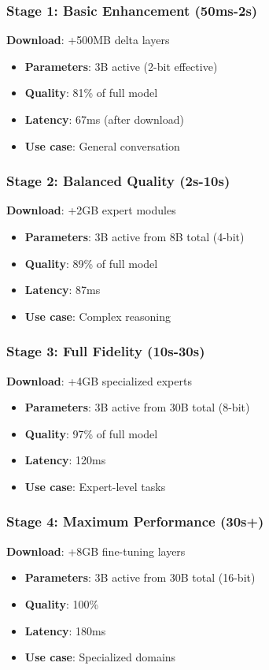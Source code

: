 \subsubsection{Stage 1: Basic Enhancement (50ms-2s)}
\textbf{Download}: +500MB delta layers
\begin{itemize}
    \item \textbf{Parameters}: 3B active (2-bit effective)
    \item \textbf{Quality}: 81\% of full model
    \item \textbf{Latency}: 67ms (after download)
    \item \textbf{Use case}: General conversation
\end{itemize}

\subsubsection{Stage 2: Balanced Quality (2s-10s)}
\textbf{Download}: +2GB expert modules
\begin{itemize}
    \item \textbf{Parameters}: 3B active from 8B total (4-bit)
    \item \textbf{Quality}: 89\% of full model
    \item \textbf{Latency}: 87ms
    \item \textbf{Use case}: Complex reasoning
\end{itemize}

\subsubsection{Stage 3: Full Fidelity (10s-30s)}
\textbf{Download}: +4GB specialized experts
\begin{itemize}
    \item \textbf{Parameters}: 3B active from 30B total (8-bit)
    \item \textbf{Quality}: 97\% of full model
    \item \textbf{Latency}: 120ms
    \item \textbf{Use case}: Expert-level tasks
\end{itemize}

\subsubsection{Stage 4: Maximum Performance (30s+)}
\textbf{Download}: +8GB fine-tuning layers
\begin{itemize}
    \item \textbf{Parameters}: 3B active from 30B total (16-bit)
    \item \textbf{Quality}: 100\% 
    \item \textbf{Latency}: 180ms
    \item \textbf{Use case}: Specialized domains
\end{itemize}

